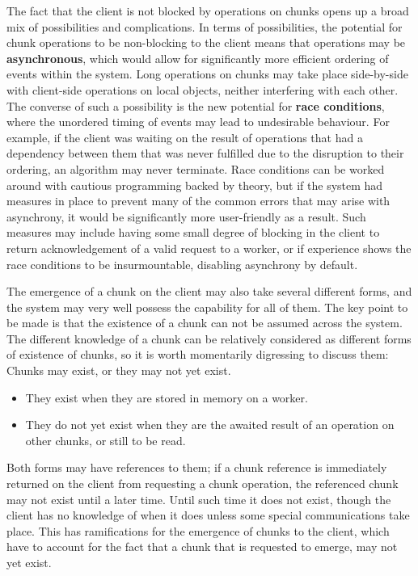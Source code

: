 The fact that the client is not blocked by operations on chunks opens up a broad mix of possibilities and complications.
In terms of possibilities, the potential for chunk operations to be non-blocking to the client means that operations may be \textbf{asynchronous}, which would allow for significantly more efficient ordering of events within the system.
Long operations on chunks may take place side-by-side with client-side operations on local objects, neither interfering with each other.
The converse of such a possibility is the new potential for \textbf{race conditions}, where the unordered timing of events may lead to undesirable behaviour.
For example, if the client was waiting on the result of operations that had a dependency between them that was never fulfilled due to the disruption to their ordering, an algorithm may never terminate.
Race conditions can be worked around with cautious programming backed by theory, but if the system had measures in place to prevent many of the common errors that may arise with asynchrony, it would be significantly more user-friendly as a result.
Such measures may include having some small degree of blocking in the client to return acknowledgement of a valid request to a worker, or if experience shows the race conditions to be insurmountable, disabling asynchrony by default.

The emergence of a chunk on the client may also take several different forms, and the system may very well possess the capability for all of them.
The key point to be made is that the existence of a chunk can not be assumed across the system.
The different knowledge of a chunk can be relatively considered as different forms of existence of chunks, so it is worth momentarily digressing to discuss them: Chunks may exist, or they may not yet exist.

\begin{itemize}
	\item
	      They exist when they are stored in memory on a worker.
	\item
	      They do not yet exist when they are the awaited result of an operation
	      on other chunks, or still to be read.
\end{itemize}

Both forms may have references to them; if a chunk reference is immediately returned on the client from requesting a chunk operation, the referenced chunk may not exist until a later time.
Until such time it does not exist, though the client has no knowledge of when it does unless some special communications take place.
This has ramifications for the emergence of chunks to the client, which have to account for the fact that a chunk that is requested to emerge, may not yet exist.

